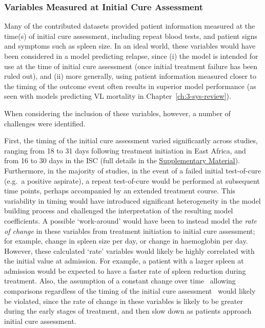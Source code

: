 \subsubsection{Variables Measured at Initial Cure Assessment}

Many of the contributed datasets provided patient information measured at the time(s) of initial cure assessment, including repeat blood tests, and patient signs and symptoms such as spleen size. In an ideal world, these variables would have been considered in a model predicting relapse, since (i) the model is intended for use at the time of initial cure assessment (once initial treatment failure has been ruled out), and (ii) more generally, using patient information measured closer to the timing of the outcome event often results in superior model performance (as seen with models predicting VL mortality in Chapter~\ref{ch:3-sys-review}).

When considering the inclusion of these variables, however, a number of challenges were identified.

First, the timing of the initial cure assessment varied significantly across studies, ranging from 18 to 31 days following treatment initiation in East Africa, and from 16 to 30 days in the ISC (full details in the \href{https://github.com/jpwil/dphil}{Supplementary Material}). Furthermore, in the majority of studies, in the event of a failed initial test-of-cure (e.g.\ a positive aspirate), a repeat test-of-cure would be performed at subsequent time points, perhaps accompanied by an extended treatment course. This variability in timing would have introduced significant heterogeneity in the model building process and challenged the interpretation of the resulting model coefficients. A possible `work-around' would have been to instead model the \textit{rate of change} in these variables from treatment initiation to initial cure assessment; for example, change in spleen size per day, or change in haemoglobin per day. However, these calculated `rate' variables would likely be highly correlated with the initial value at admission. For example, a patient with a larger spleen at admission would be expected to have a faster rate of spleen reduction during treatment. Also, the assumption of a constant change over time \textemdash\ allowing comparisons regardless of the timing of the initial cure assessment \textemdash\ would likely be violated, since the rate of change in these variables is likely to be greater during the early stages of treatment, and then slow down as patients approach initial cure assessment.

